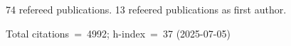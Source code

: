 74 refereed publications. 13 refeered publications as first author.

Total citations~=~4992; h-index~=~37 (2025-07-05)